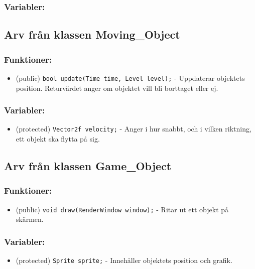 \documentclass{TDP005mall}
\begin{document}
\subsubsection{Variabler:}

\subsection{Arv från klassen Moving\_Object}
\subsubsection{Funktioner:}
\begin{itemize}
  \item (public) \verb|bool update(Time time, Level level);| - Uppdaterar objektets position. Returvärdet anger om objektet vill bli borttaget eller ej. 
\end{itemize}

\subsubsection{Variabler:}
\begin{itemize}
  \item (protected) \verb|Vector2f velocity;| - Anger i hur snabbt, och i vilken riktning, ett objekt ska flytta på sig. 
\end{itemize}

\subsection{Arv från klassen Game\_Object}
\subsubsection{Funktioner:}
\begin{itemize}
  \item (public) \verb|void draw(RenderWindow window);| - Ritar ut ett objekt på skärmen.
\end{itemize}

\subsubsection{Variabler:}
\begin{itemize}
  \item (protected) \verb|Sprite sprite;| - Innehåller objektets position och grafik. 
\end{itemize}
\end{document}
